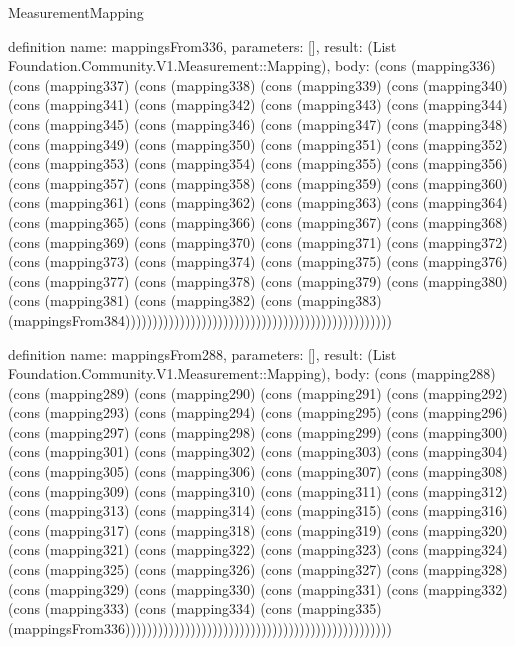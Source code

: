 \begin{lexlean}{MeasurementMapping}
\begin{semanticmodule}
definition{
  name: mappingsFrom336,
  parameters: [],
  result: (List Foundation.Community.V1.Measurement::Mapping),
  body: (cons (mapping336) (cons (mapping337) (cons (mapping338) (cons (mapping339) (cons (mapping340) (cons (mapping341) (cons (mapping342) (cons (mapping343) (cons (mapping344) (cons (mapping345) (cons (mapping346) (cons (mapping347) (cons (mapping348) (cons (mapping349) (cons (mapping350) (cons (mapping351) (cons (mapping352) (cons (mapping353) (cons (mapping354) (cons (mapping355) (cons (mapping356) (cons (mapping357) (cons (mapping358) (cons (mapping359) (cons (mapping360) (cons (mapping361) (cons (mapping362) (cons (mapping363) (cons (mapping364) (cons (mapping365) (cons (mapping366) (cons (mapping367) (cons (mapping368) (cons (mapping369) (cons (mapping370) (cons (mapping371) (cons (mapping372) (cons (mapping373) (cons (mapping374) (cons (mapping375) (cons (mapping376) (cons (mapping377) (cons (mapping378) (cons (mapping379) (cons (mapping380) (cons (mapping381) (cons (mapping382) (cons (mapping383) (mappingsFrom384)))))))))))))))))))))))))))))))))))))))))))))))))
}

definition{
  name: mappingsFrom288,
  parameters: [],
  result: (List Foundation.Community.V1.Measurement::Mapping),
  body: (cons (mapping288) (cons (mapping289) (cons (mapping290) (cons (mapping291) (cons (mapping292) (cons (mapping293) (cons (mapping294) (cons (mapping295) (cons (mapping296) (cons (mapping297) (cons (mapping298) (cons (mapping299) (cons (mapping300) (cons (mapping301) (cons (mapping302) (cons (mapping303) (cons (mapping304) (cons (mapping305) (cons (mapping306) (cons (mapping307) (cons (mapping308) (cons (mapping309) (cons (mapping310) (cons (mapping311) (cons (mapping312) (cons (mapping313) (cons (mapping314) (cons (mapping315) (cons (mapping316) (cons (mapping317) (cons (mapping318) (cons (mapping319) (cons (mapping320) (cons (mapping321) (cons (mapping322) (cons (mapping323) (cons (mapping324) (cons (mapping325) (cons (mapping326) (cons (mapping327) (cons (mapping328) (cons (mapping329) (cons (mapping330) (cons (mapping331) (cons (mapping332) (cons (mapping333) (cons (mapping334) (cons (mapping335) (mappingsFrom336)))))))))))))))))))))))))))))))))))))))))))))))))
}


\end{semanticmodule}
\end{lexlean}
